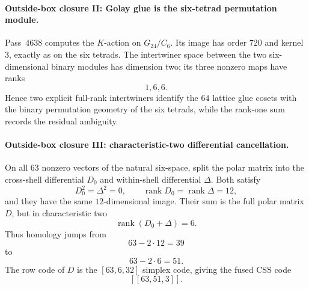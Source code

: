 \paragraph{Outside-box closure II: Golay glue is the six-tetrad permutation module.}
Pass~4638 computes the $K$-action on $G_{24}/C_6$.  Its image has order $720$ and kernel $3$, exactly as on the six tetrads.  The intertwiner space between the two six-dimensional binary modules has dimension two; its three nonzero maps have ranks
\[
 1,6,6.
\]
Hence two explicit full-rank intertwiners identify the $64$ lattice glue cosets with the binary permutation geometry of the six tetrads, while the rank-one sum records the residual ambiguity.

\paragraph{Outside-box closure III: characteristic-two differential cancellation.}
On all $63$ nonzero vectors of the natural six-space, split the polar matrix into the cross-shell differential $D_0$ and within-shell differential $\Delta$.  Both satisfy
\[
 D_0^2=\Delta^2=0,\qquad \operatorname{rank}D_0=\operatorname{rank}\Delta=12,
\]
and they have the same $12$-dimensional image.  Their sum is the full polar matrix $D$, but in characteristic two
\[
 \operatorname{rank}(D_0+\Delta)=6.
\]
Thus homology jumps from
\[
 63-2\cdot12=39
\]
to
\[
 63-2\cdot6=51.
\]
The row code of $D$ is the $[63,6,32]$ simplex code, giving the fused CSS code
\[
 \boxed{[[63,51,3]]}.
\]

\begin{center}
\end{center}
